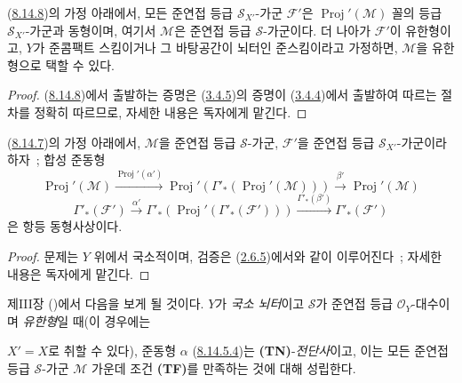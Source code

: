 \begin{corollary}[8.14.9]
\label{II.8.14.9-ko}
(\hyperref[II.8.14.8-ko]{8.14.8})의 가정 아래에서, 모든 준연접 등급
$\mathcal{S}_{X'}$-가군 $\mathcal{F}'$은
$\operatorname{Proj}'(\mathcal{M})$ 꼴의 등급 $\mathcal{S}_{X'}$-가군과
동형이며, 여기서 $\mathcal{M}$은 준연접 등급 $\mathcal{S}$-가군이다.
더 나아가 $\mathcal{F}'$이 유한형이고, $Y$가 준콤팩트 스킴이거나 그
바탕공간이 뇌터인 준스킴이라고 가정하면, $\mathcal{M}$을 유한형으로
택할 수 있다.
\end{corollary}

\begin{proof}
(\hyperref[II.8.14.8-ko]{8.14.8})에서 출발하는 증명은
(\hyperref[II.3.4.5-ko]{3.4.5})의 증명이
(\hyperref[II.3.4.4-ko]{3.4.4})에서 출발하여 따르는 절차를 정확히 따르므로,
자세한 내용은 독자에게 맡긴다.
\end{proof}

\begin{proposition}[8.14.10]
\label{II.8.14.10-ko}
(\hyperref[II.8.14.7-ko]{8.14.7})의 가정 아래에서,
$\mathcal{M}$을 준연접 등급 $\mathcal{S}$-가군,
$\mathcal{F}'$을 준연접 등급 $\mathcal{S}_{X'}$-가군이라 하자~; 합성
준동형
\begin{equation}
\label{II.8.14.10.1-ko}
  \operatorname{Proj}'(\mathcal{M})
  \xrightarrow{\operatorname{Proj}'(\alpha')}
  \operatorname{Proj}'(\Gamma'_*(\operatorname{Proj}'(\mathcal{M})))
  \xrightarrow{\beta'}\operatorname{Proj}'(\mathcal{M})
\tag{8.14.10.1}
\end{equation}
\begin{equation}
\label{II.8.14.10.2-ko}
  \Gamma'_*(\mathcal{F}')
  \xrightarrow{\alpha'}
  \Gamma'_*(\operatorname{Proj}'(\Gamma'_*(\mathcal{F}')))
  \xrightarrow{\Gamma'_*(\beta')}\Gamma'_*(\mathcal{F}')
\tag{8.14.10.2}
\end{equation}
은 항등 동형사상이다.
\end{proposition}

\begin{proof}
문제는 $Y$ 위에서 국소적이며, 검증은
(\hyperref[II.2.6.5-ko]{2.6.5})에서와 같이 이루어진다~; 자세한 내용은
독자에게 맡긴다.
\end{proof}

\begin{remark}[8.14.11]
\label{II.8.14.11-ko}
제III장 ()에서 다음을 보게 될 것이다.
$Y$가 \emph{국소 뇌터}이고 $\mathcal{S}$가 준연접 등급
$\mathcal{O}_Y$-대수이며 \emph{유한형}일 때(이
경우에는

$X'=X$로 취할 수 있다), 준동형 $\alpha$
(\hyperref[II.8.14.5.4-ko]{8.14.5.4})는 \textbf{(TN)}-\emph{전단사}이고,
이는 모든 준연접 등급 $\mathcal{S}$-가군 $\mathcal{M}$ 가운데
조건 \textbf{(TF)}를 만족하는 것에 대해 성립한다.
\end{remark}

